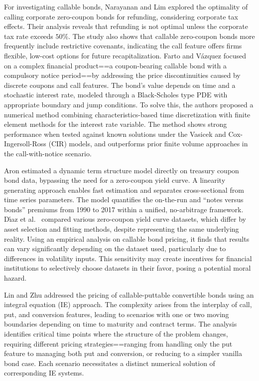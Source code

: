 \documentclass[reqno]{amsart}
\begin{document}
For investigating callable bonds, Narayanan and Lim \cite{narayanan1989call} explored 
the optimality of calling corporate zero-coupon bonds for refunding, considering 
corporate tax effects. Their analysis reveals that refunding is not optimal unless the 
corporate tax rate exceeds $50\%$. The study also shows that callable zero-coupon bonds 
more frequently include restrictive covenants, indicating the call feature offers firms 
flexible, low-cost options for future recapitalization.
Farto and V\'azquez \cite{farto2005numerical} focused on a complex financial 
product==a coupon-bearing callable bond with a compulsory notice period==by 
addressing the price discontinuities caused by discrete coupons and call features. 
The bond's value depends on time and a stochastic interest rate, modeled through a
Black-Scholes type PDE with appropriate boundary and jump conditions. 
To solve this, the authors proposed a numerical method combining characteristics-based 
time discretization with finite element methods for the interest rate variable. 
The method shows strong performance when tested against known solutions under the 
Vasicek and Cox-Ingersoll-Ross (CIR) models, and outperforms prior finite volume 
approaches in the call-with-notice scenario.

Aron \cite{aaron2021zero} estimated a dynamic term structure model directly on treasury 
coupon bond data, bypassing the need for a zero-coupon yield curve. 
A linearity generating approach enables fast estimation and separates cross-sectional 
from time series parameters. The model quantifies the on-the-run and “notes versus 
bonds” premiums from 1990 to 2017 within a unified, no-arbitrage framework.
D{\'\i}az et al.\ \cite{diaz2022yield} compared various zero-coupon yield curve datasets,
which differ by asset selection and fitting methods, despite representing the same 
underlying reality. Using an empirical analysis on callable bond pricing, 
it finds that results can vary significantly depending on the dataset used, 
particularly due to differences in volatility inputs. This sensitivity may create 
incentives for financial institutions to selectively choose datasets in their favor, 
posing a potential moral hazard.

Lin and Zhu \cite{lin2022pricing} addressed the pricing of callable-puttable 
convertible bonds using an integral equation (IE) approach. The complexity arises 
from the interplay of call, put, and conversion features, leading to scenarios with 
one or two moving boundaries depending on time to maturity and contract terms. 
The analysis identifies critical time points where the structure of the problem changes, 
requiring different pricing strategies==ranging from handling only the put feature 
to managing both put and conversion, or reducing to a simpler vanilla bond case. 
Each scenario necessitates a distinct numerical solution of corresponding IE systems.
\end{document}
